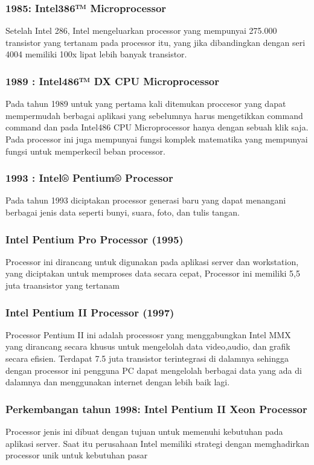  			\subsubsection{1985: Intel386™ Microprocessor}
 	Setelah Intel 286, Intel mengeluarkan processor yang mempunyai 275.000 transistor yang tertanam pada processor itu, yang jika dibandingkan dengan seri 4004 memiliki 100x lipat lebih banyak transistor.

 			\subsubsection{1989 : Intel486™ DX CPU Microprocessor}
 	Pada tahun 1989 untuk yang pertama kali  ditemukan proccesor yang dapat mempermudah berbagai aplikasi yang sebelumnya harus mengetikkan command command dan pada Intel486 CPU Microprocessor hanya dengan sebuah klik saja. Pada processor ini juga mempunyai fungsi komplek matematika yang mempunyai fungsi untuk memperkecil beban processor.
 			\subsubsection {1993 : Intel® Pentium® Processor}
 	Pada tahun 1993 diciptakan processor generasi baru yang dapat menangani berbagai jenis data seperti bunyi, suara, foto, dan tulis tangan.


 			\subsubsection{Intel Pentium Pro Processor (1995)}
 	Processor ini dirancang untuk digunakan pada aplikasi server dan workstation, yang diciptakan untuk memproses data secara cepat, Processor ini memiliki 5,5 juta traansistor yang tertanam
 			\subsubsection{Intel Pentium II Processor (1997)}	
 	Processor Pentium II ini adalah processosr yang menggabungkan Intel MMX yang dirancang secara khusus untuk mengelolah data video,audio, dan grafik secara efisien. Terdapat 7.5 juta transistor terintegrasi di dalamnya sehingga dengan processor ini pengguna PC dapat mengelolah berbagai data yang ada di dalamnya dan menggunakan internet dengan lebih baik lagi.


 			\subsubsection{Perkembangan tahun 1998: Intel Pentium II Xeon Processor}
 	Processor jenis ini dibuat dengan tujuan untuk memenuhi kebutuhan pada aplikasi server. Saat itu perusahaan Intel memiliki strategi dengan memghadirkan processor unik untuk kebutuhan pasar
